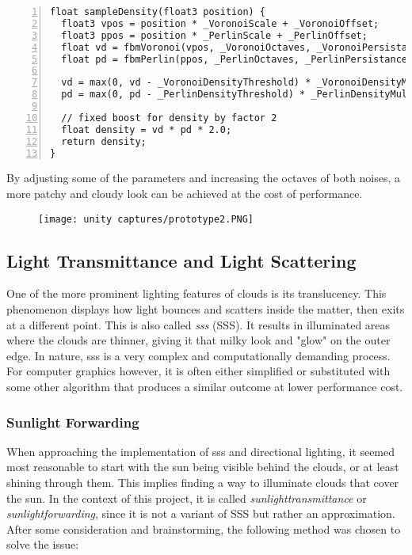 \begin{lstlisting}[language=HLSL, numbers=left, caption=Implementation of a density sampling function., label=lst:shader:prototype:sampledensity]
float sampleDensity(float3 position) {
  float3 vpos = position * _VoronoiScale + _VoronoiOffset;
  float3 ppos = position * _PerlinScale + _PerlinOffset;
  float vd = fbmVoronoi(vpos, _VoronoiOctaves, _VoronoiPersistance));
  float pd = fbmPerlin(ppos, _PerlinOctaves, _PerlinPersistance));
  
  vd = max(0, vd - _VoronoiDensityThreshold) * _VoronoiDensityMultiplier;
  pd = max(0, pd - _PerlinDensityThreshold) * _PerlinDensityMultiplier;
  
  // fixed boost for density by factor 2
  float density = vd * pd * 2.0;
  return density;
}
\end{lstlisting}

\noindent
By adjusting some of the \gls{parameters} and increasing the octaves of both noises, a more patchy and cloudy look can be achieved at the cost of performance.

\begin{figure}[H]
    \centering
    \texttt{[image: unity captures/prototype2.PNG]}
    \label{img:captures:prototype2}
\end{figure}

\clearpage
\subsection{Light Transmittance and Light Scattering}
One of the more prominent lighting features of clouds is its translucency. This phenomenon displays how light bounces and scatters inside the matter, then exits at a different point. This is also called \textit{\gls{sss}} (SSS).
It results in illuminated areas where the clouds are thinner, giving it that milky look and "glow" on the outer edge. In nature, \gls{sss} is a very complex and computationally demanding process. For computer graphics however, it is often either simplified or substituted with some other algorithm that produces a similar outcome at lower performance cost.

\subsubsection{Sunlight Forwarding}
When approaching the implementation of \gls{sss} and directional lighting, it seemed most reasonable to start with the sun being visible behind the clouds, or at least shining through them.
This implies finding a way to illuminate clouds that cover the sun. In the context of this project, it is called \textit{\gls{sunlighttransmittance}} or \textit{\gls{sunlightforwarding}}, since it is not a variant of SSS but rather an approximation.
\\
After some consideration and brainstorming, the following method was chosen to solve the issue:

